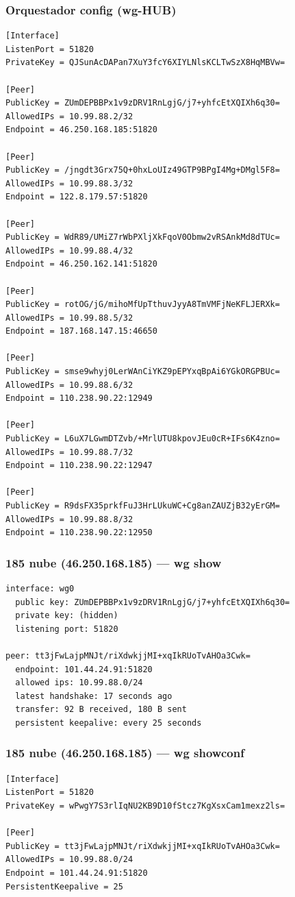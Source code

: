 \documentclass[11pt,a4paper]{article}
\begin{document}
\subsubsection*{Orquestador config (wg-HUB)}
\begin{lstlisting}
[Interface]
ListenPort = 51820
PrivateKey = QJSunAcDAPan7XuY3fcY6XIYLNlsKCLTwSzX8HqMBVw=

[Peer]
PublicKey = ZUmDEPBBPx1v9zDRV1RnLgjG/j7+yhfcEtXQIXh6q30=
AllowedIPs = 10.99.88.2/32
Endpoint = 46.250.168.185:51820

[Peer]
PublicKey = /jngdt3Grx75Q+0hxLoUIz49GTP9BPgI4Mg+DMgl5F8=
AllowedIPs = 10.99.88.3/32
Endpoint = 122.8.179.57:51820

[Peer]
PublicKey = WdR89/UMiZ7rWbPXljXkFqoV0Obmw2vRSAnkMd8dTUc=
AllowedIPs = 10.99.88.4/32
Endpoint = 46.250.162.141:51820

[Peer]
PublicKey = rotOG/jG/mihoMfUpTthuvJyyA8TmVMFjNeKFLJERXk=
AllowedIPs = 10.99.88.5/32
Endpoint = 187.168.147.15:46650

[Peer]
PublicKey = smse9whyj0LerWAnCiYKZ9pEPYxqBpAi6YGkORGPBUc=
AllowedIPs = 10.99.88.6/32
Endpoint = 110.238.90.22:12949

[Peer]
PublicKey = L6uX7LGwmDTZvb/+MrlUTU8kpovJEu0cR+IFs6K4zno=
AllowedIPs = 10.99.88.7/32
Endpoint = 110.238.90.22:12947

[Peer]
PublicKey = R9dsFX35prkfFuJ3HrLUkuWC+Cg8anZAUZjB32yErGM=
AllowedIPs = 10.99.88.8/32
Endpoint = 110.238.90.22:12950

\end{lstlisting}

\subsubsection*{185 nube (46.250.168.185) — wg show}
\begin{lstlisting}
interface: wg0
  public key: ZUmDEPBBPx1v9zDRV1RnLgjG/j7+yhfcEtXQIXh6q30=
  private key: (hidden)
  listening port: 51820

peer: tt3jFwLajpMNJt/riXdwkjjMI+xqIkRUoTvAHOa3Cwk=
  endpoint: 101.44.24.91:51820
  allowed ips: 10.99.88.0/24
  latest handshake: 17 seconds ago
  transfer: 92 B received, 180 B sent
  persistent keepalive: every 25 seconds

\end{lstlisting}

\subsubsection*{185 nube (46.250.168.185) — wg showconf}
\begin{lstlisting}
[Interface]
ListenPort = 51820
PrivateKey = wPwgY7S3rlIqNU2KB9D10fStcz7KgXsxCam1mexz2ls=

[Peer]
PublicKey = tt3jFwLajpMNJt/riXdwkjjMI+xqIkRUoTvAHOa3Cwk=
AllowedIPs = 10.99.88.0/24
Endpoint = 101.44.24.91:51820
PersistentKeepalive = 25

\end{lstlisting}
\end{document}
